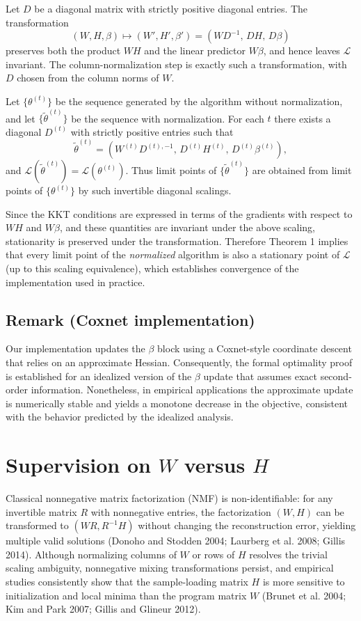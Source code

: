 \documentclass[
]{article}
\begin{document}
Let \(D\) be a diagonal matrix with strictly positive diagonal entries.
The transformation \[
  (W,H,\beta) \mapsto (W',H',\beta') = (W D^{-1},\, D H,\, D\beta)
\] preserves both the product \(WH\) and the linear predictor
\(W\beta\), and hence leaves \(\mathcal{L}\) invariant. The
column-normalization step is exactly such a transformation, with \(D\)
chosen from the column norms of \(W\).

Let \(\{\theta^{(t)}\}\) be the sequence generated by the algorithm
without normalization, and let \(\{\tilde{\theta}^{(t)}\}\) be the
sequence with normalization. For each \(t\) there exists a diagonal
\(D^{(t)}\) with strictly positive entries such that \[
  \tilde{\theta}^{(t)} =
  (W^{(t)} D^{(t),-1},\, D^{(t)} H^{(t)},\, D^{(t)}\beta^{(t)}),
\] and
\(\mathcal{L}(\tilde{\theta}^{(t)}) = \mathcal{L}(\theta^{(t)})\). Thus
limit points of \(\{\tilde{\theta}^{(t)}\}\) are obtained from limit
points of \(\{\theta^{(t)}\}\) by such invertible diagonal scalings.

Since the KKT conditions are expressed in terms of the gradients with
respect to \(WH\) and \(W\beta\), and these quantities are invariant
under the above scaling, stationarity is preserved under the
transformation. Therefore Theorem 1 implies that every limit point of
the \emph{normalized} algorithm is also a stationary point of
\(\mathcal{L}\) (up to this scaling equivalence), which establishes
convergence of the implementation used in practice.

\subsection{Remark (Coxnet implementation)}

Our implementation updates the \(\beta\) block using a Coxnet-style
coordinate descent that relies on an approximate Hessian. Consequently,
the formal optimality proof is established for an idealized version of
the \(\beta\) update that assumes exact second-order information.
Nonetheless, in empirical applications the approximate update is
numerically stable and yields a monotone decrease in the objective,
consistent with the behavior predicted by the idealized analysis.

\section{Supervision on \(W\) versus \(H\)}

Classical nonnegative matrix factorization (NMF) is non-identifiable:
for any invertible matrix \(R\) with nonnegative entries, the
factorization \((W, H)\) can be transformed to \((W R, R^{-1} H)\)
without changing the reconstruction error, yielding multiple valid
solutions (Donoho and Stodden 2004; Laurberg et al. 2008; Gillis 2014).
Although normalizing columns of \(W\) or rows of \(H\) resolves the
trivial scaling ambiguity, nonnegative mixing transformations persist,
and empirical studies consistently show that the sample-loading matrix
\(H\) is more sensitive to initialization and local minima than the
program matrix \(W\) (Brunet et al. 2004; Kim and Park 2007; Gillis and
Glineur 2012).
\end{document}
